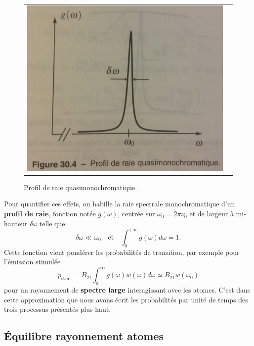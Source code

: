 \documentclass[11pt,a4paper]{report}
\begin{document}
\begin{figure}[h!]
\begin{center}
	\begin{tabular}{cc}
		\includegraphics[scale = 0.45]{profilderaie.png}
	\end{tabular}
\end{center}
\caption{Profil de raie quasimonochromatique.}
\end{figure}

Pour quantifier ces effets, on habille la raie spectrale monochromatique d'un \textbf{profil de raie}, fonction notée $g(\omega)$, centrée sur $\omega_0 = 2\pi\nu_0$ et de largeur à mi-hauteur $\delta\omega$ telle que
\begin{equation}
	\delta \omega \ll \omega_0 \quad\text{et}\quad \int_0^{+\infty} g(\omega)d\omega = 1.
\end{equation}
Cette fonction vient pondérer les probabilités de transition, par exemple pour l'émission stimulée
\begin{equation}
	p_\text{stim.} = B_{21}\int_0^\infty g(\omega)w(\omega)d\omega \simeq B_{21}w(\omega_0)
\end{equation}
pour un rayonnement de \textbf{spectre large} interagissant avec les atomes. C'est dans cette approximation que nous avons écrit les probabilités par unité de temps des trois processus présentés plus haut.

\newpage
\subsection{Équilibre rayonnement atomes}
\end{document}
